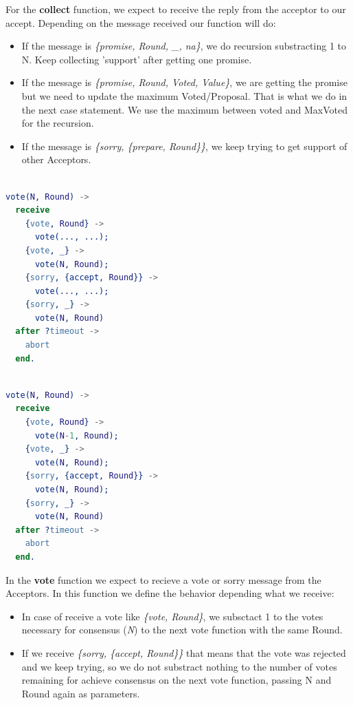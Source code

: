 \documentclass[a4paper, 10pt]{article}
\begin{document}

For the \textbf{collect} function, we expect to receive the reply from the acceptor to our accept. Depending on the message received our function will do:

\begin{itemize}
  \item If the message is \textit{\{promise, Round, \_, na\}}, we do recursion substracting 1 to N. Keep collecting 'support' after getting one promise.
  \item If the message is \textit{\{promise, Round, Voted, Value\}}, we are getting the promise but we need to update the maximum Voted/Proposal. That is what we do in the next case statement. We use the maximum between voted and MaxVoted for the recursion.
  \item If the message is \textit{\{sorry, \{prepare, Round\}\}}, we keep trying to get support of other Acceptors.
\end{itemize}



    \begin{minipage}{.45\textwidth}
	\begin{lstlisting}[language=erlang, caption={Template}]
	
vote(N, Round) ->
  receive
    {vote, Round} ->
      vote(..., ...);
    {vote, _} ->
      vote(N, Round);
    {sorry, {accept, Round}} ->
      vote(..., ...);
    {sorry, _} ->
      vote(N, Round)
  after ?timeout ->
    abort
  end.
  \end{lstlisting}
    \end{minipage}\hfill
    \begin{minipage}{.45\textwidth}
	\begin{lstlisting}[language=erlang, caption={Filled version}]
	
vote(N, Round) ->
  receive
    {vote, Round} ->
      vote(N-1, Round);
    {vote, _} ->
      vote(N, Round);
    {sorry, {accept, Round}} ->
      vote(N, Round);
    {sorry, _} ->
      vote(N, Round)
  after ?timeout ->
    abort
  end.
	\end{lstlisting}
    \end{minipage}

  In the \textbf{vote} function we expect to recieve a vote or sorry message from the Acceptors. In this function we define the behavior depending what we receive: 
  
  \begin{itemize}
    \item In case of receive a vote like \textit{\{vote, Round\}}, we subsctact 1 to the votes necessary for consensus (\textit{N}) to the next vote function with the same Round. 

    \item If we receive \textit{\{sorry, \{accept, Round\}\}} that means that the vote was rejected and we keep trying, so we do not substract nothing to the number of votes remaining for achieve consensus on the next vote function, passing N and Round again as parameters.
  \end{itemize}
    
\end{document}
